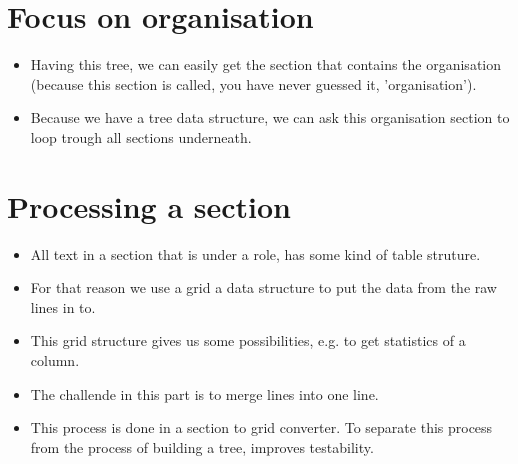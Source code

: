 \documentclass{ou-report}
\begin{document}
\section{Focus on organisation}
\begin{itemize}
    \item Having this tree, we can easily get the section that contains the 
        organisation (because this section is called, you have never guessed it, 
        'organisation').
    \item Because we have a tree data structure, we can ask this organisation 
        section to loop trough all sections underneath.
\end{itemize}

\section{Processing a section}
\begin{itemize}
    \item All text in a section that is under a role, has some kind of table 
        struture.
    \item For that reason we use a grid a data structure to put the data from 
        the raw lines in to.
    \item This grid structure gives us some possibilities, e.g. to get 
        statistics of a column.
    \item The challende in this part is to merge lines into one line.
    \item This process is done in a section to grid converter. To separate this
        process from the process of building a tree, improves testability.
\end{itemize}
\end{document}
